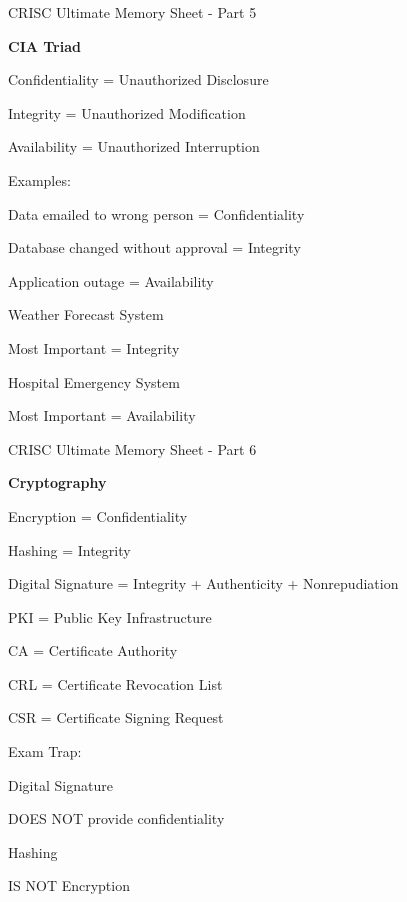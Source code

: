 \documentclass{beamer}
\begin{document}
	\begin{frame}[shrink=5]{CRISC Ultimate Memory Sheet - Part 5}
		\footnotesize
		
		\textbf{CIA Triad}
		
		Confidentiality
		= Unauthorized Disclosure
		
		Integrity
		= Unauthorized Modification
		
		Availability
		= Unauthorized Interruption
		
		\medskip
		
		Examples:
		
		Data emailed to wrong person
		= Confidentiality
		
		Database changed without approval
		= Integrity
		
		Application outage
		= Availability
		
		\medskip
		
		Weather Forecast System
		
		Most Important = Integrity
		
		Hospital Emergency System
		
		Most Important = Availability
		
	\end{frame}
	
	\begin{frame}[shrink=5]{CRISC Ultimate Memory Sheet - Part 6}
		\footnotesize
		
		\textbf{Cryptography}
		
		Encryption
		= Confidentiality
		
		Hashing
		= Integrity
		
		Digital Signature
		= Integrity + Authenticity + Nonrepudiation
		
		PKI
		= Public Key Infrastructure
		
		CA
		= Certificate Authority
		
		CRL
		= Certificate Revocation List
		
		CSR
		= Certificate Signing Request
		
		\medskip
		
		Exam Trap:
		
		Digital Signature
		
		DOES NOT provide confidentiality
		
		Hashing
		
		IS NOT Encryption
		
	\end{frame}
	
\end{document}
